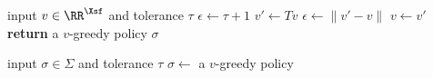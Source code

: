 \begin{algorithm}
\DontPrintSemicolon
input $v \in \RR^\Xsf$ and tolerance $\tau$ \;
$\epsilon \leftarrow \tau + 1$ \;
\While{$\epsilon > \tau$}
{
    $v' \leftarrow Tv$ \;
    $\epsilon \leftarrow \| v' - v \|$ \;
    $v \leftarrow v'$ \;
}
\textbf{return} a $v$-greedy policy $\sigma$ \;
\caption{\label{algo:vfi} Value function iteration}
\end{algorithm}

\begin{algorithm}
\DontPrintSemicolon
input $\sigma \in \Sigma$ and tolerance $\tau$ \;
\While{$\epsilon > \tau$}
{
    $\sigma \leftarrow$ a $v$-greedy policy \;
}
\Return{$\sigma$}
\caption{\label{algo:hpi} Howard policy iteration}
\end{algorithm}

